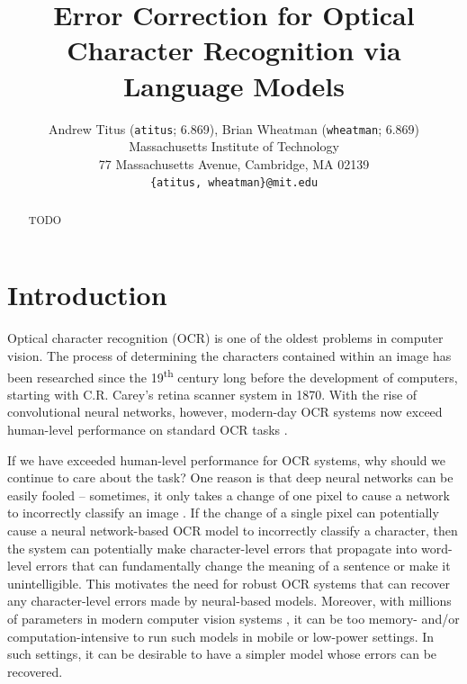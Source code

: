 \documentclass[10pt,twocolumn,letterpaper]{article}
\begin{document}
\title{Error Correction for Optical Character Recognition via Language Models}

\author{Andrew Titus (\texttt{atitus}; 6.869), Brian Wheatman (\texttt{wheatman}; 6.869)\\
Massachusetts Institute of Technology\\
77 Massachusetts Avenue, Cambridge, MA 02139\\
{\tt\small \{atitus, wheatman\}@mit.edu}
}

\maketitle

\begin{abstract}
TODO
\end{abstract}

\section{Introduction}
\label{introduction}
Optical character recognition (OCR) is one of the oldest problems
in computer vision. The process of determining the characters
contained within an image has been researched since the
19\textsuperscript{th} century \cite{Eikvil93-OCR} long before the
development of computers, starting with C.R. Carey's retina
scanner system in 1870. With the rise of convolutional neural networks,
however, modern-day OCR systems now exceed human-level performance on
standard OCR tasks \cite{Chen15-BHR}.

If we have exceeded human-level performance for OCR systems, why should we
continue to care about the task? One reason is that deep neural networks
can be easily fooled -- sometimes, it only takes a change of one pixel
to cause a network to incorrectly classify an image \cite{Su17-OPA}.
If the change of a single pixel can potentially cause a neural
network-based OCR model to incorrectly classify a character, then
the system can potentially make character-level errors that propagate
into word-level errors that can fundamentally change the meaning of
a sentence or make it unintelligible. This motivates the need for
robust OCR systems that can recover any character-level errors made
by neural-based models. Moreover, with millions of parameters in modern
computer vision systems \cite{AlexNet, VGG}, it can be too memory-
and/or computation-intensive to run such models in mobile or low-power
settings. In such settings, it can be desirable to have a simpler model
whose errors can be recovered.
\end{document}
